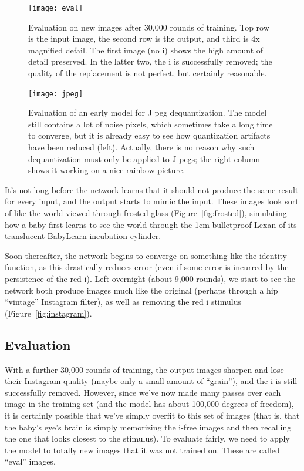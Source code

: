 \documentclass[twocolumn]{article}
\begin{document}
\begin{figure}[htb]
\begin{center}
\texttt{[image: eval]}
\end{center}
\caption{Evaluation on new images after 30,000 rounds of training. Top row
is the input image, the second row is the output, and third is 4x magnified
defail. The first image (no i) shows the high amount of detail preserved.
In the latter two, the i is successfully removed; the quality of the replacement
is not perfect, but certainly reasonable.} \label{fig:eval}
\end{figure}

\begin{figure}[htb]
\begin{center}
\texttt{[image: jpeg]}
\end{center}
\caption{Evaluation of an early model for J peg dequantization. The model
still contains a lot of noise pixels, which sometimes take a long time to
converge, but it is already easy to see how quantization artifacts have been reduced (left).
Actually, there is no reason why such dequantization must only be applied to J pegs;
the right column shows it working on a nice rainbow picture.
} \label{fig:jpeg}
\end{figure}

It's not long before the network learns that it should not produce the
same result for every input, and the output starts to mimic the
input. These images look sort of like the world viewed through frosted
glass (Figure~\ref{fig:frosted}), simulating how a baby first learns
to see the world through the 1cm bulletproof Lexan of its translucent
BabyLearn incubation cylinder.

Soon thereafter, the network begins to converge on something like the
identity function, as this drastically reduces error (even if some
error is incurred by the persistence of the red i). Left overnight
(about 9,000 rounds), we start to see the network both produce images
much like the original (perhaps through a hip ``vintage'' Instagram
filter), as well as removing the red i stimulus (Figure~\ref{fig:instagram}).


\subsection{Evaluation} \label{sec:evaluation}

With a further 30,000 rounds of training, the output images sharpen
and lose their Instagram quality (maybe only a small amount of
``grain''), and the i is still successfully removed. However, since
we've now made many passes over each image in the training set (and
the model has about 100,000 degrees of freedom), it is certainly
possible that we've simply overfit to this set of images (that is,
that the baby's eye's brain is simply memorizing the i-free images and
then recalling the one that looks closest to the stimulus). To evaluate
fairly, we need to apply the model to totally new images that it was
not trained on. These are called ``eval'' images.
\end{document}
